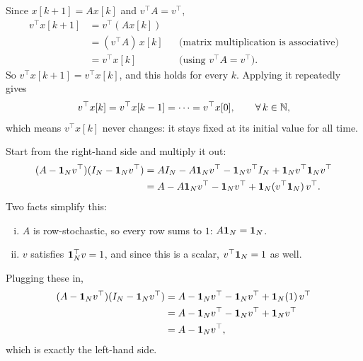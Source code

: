 \documentclass[a4paper, 11pt]{article}
\begin{document}
\begin{solution}
Since $x[k+1]=Ax[k]$ and $v^\top A=v^\top$,
\begin{align*}
    v^\top x[k+1] &= v^\top(Ax[k]) \\
                  &= (v^\top A)\,x[k] && \text{(matrix multiplication is associative)} \\
                  &= v^\top x[k]       && \text{(using } v^\top A=v^\top\text{)}.
\end{align*}
So $v^\top x[k+1]=v^\top x[k]$, and this holds for every $k$. Applying it repeatedly gives
\begin{align*}
    v^\top x[k] = v^\top x[k-1] = \cdots = v^\top x[0], \qquad \forall\,k\in\mathbb{N},
\end{align*}
which means $v^\top x[k]$ never changes: it stays fixed at its initial value for all time.

Start from the right-hand side and multiply it out:
\begin{align*}
    (A-\mathbf{1}_N v^\top)(I_N-\mathbf{1}_N v^\top) &= AI_N - A\mathbf{1}_N v^\top - \mathbf{1}_N v^\top I_N + \mathbf{1}_N v^\top\mathbf{1}_N v^\top \\
    &= A - A\mathbf{1}_N v^\top - \mathbf{1}_N v^\top + \mathbf{1}_N (v^\top\mathbf{1}_N)\,v^\top.
\end{align*}
Two facts simplify this:
\begin{enumerate}[(i)]
    \item $A$ is row-stochastic, so every row sums to $1$: $A\mathbf{1}_N=\mathbf{1}_N$.
    \item $v$ satisfies $\mathbf{1}_N^\top v=1$, and since this is a scalar, $v^\top\mathbf{1}_N=1$ as well.
\end{enumerate}
Plugging these in,
\begin{align*}
    (A-\mathbf{1}_N v^\top)(I_N-\mathbf{1}_N v^\top) &= A - \mathbf{1}_N v^\top - \mathbf{1}_N v^\top + \mathbf{1}_N(1)\,v^\top \\
    &= A - \mathbf{1}_N v^\top - \mathbf{1}_N v^\top + \mathbf{1}_N v^\top \\
    &= A - \mathbf{1}_N v^\top,
\end{align*}
which is exactly the left-hand side.


\end{solution}
\end{document}
